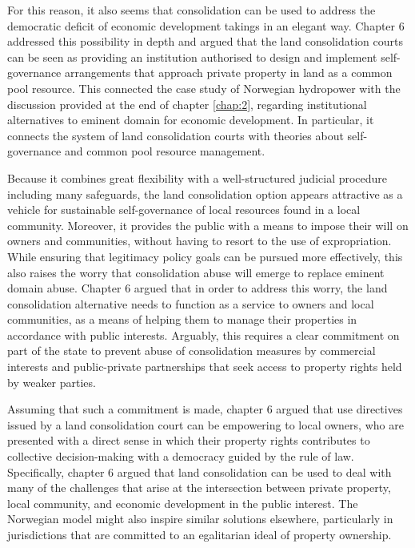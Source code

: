 For this reason, it also seems that consolidation can be used to address the democratic deficit of economic development takings in an elegant way. Chapter 6 addressed this possibility in depth and argued that the land consolidation courts can be seen as providing an institution authorised to design and implement self-governance arrangements that approach private property in land as a common pool resource. This connected the case study of Norwegian hydropower with the discussion provided at the end of chapter \ref{chap:2}, regarding institutional alternatives to eminent domain for economic development. In particular, it connects the system of land consolidation courts with theories about self-governance and common pool resource management.

Because it combines great flexibility with a well-structured judicial procedure including many safeguards, the land consolidation option appears attractive as a vehicle for sustainable self-governance of local resources found in a local community. Moreover, it provides the public with a means to impose their will on owners and communities, without having to resort to the use of expropriation. While ensuring that legitimacy policy goals can be pursued more effectively, this also raises the worry that consolidation abuse will emerge to replace eminent domain abuse. Chapter 6 argued that in order to address this worry, the land consolidation alternative needs to function as a service to owners and local communities, as a means of helping them to manage their properties in accordance with public interests. Arguably, this requires a clear commitment on part of the state to prevent abuse of consolidation measures by commercial interests and public-private partnerships that seek access to property rights held by weaker parties.

Assuming that such a commitment is made, chapter 6 argued that use directives issued by a land consolidation court can be empowering to local owners, who are presented with a direct sense in which their property rights contributes to collective decision-making with a democracy guided by the rule of law. Specifically, chapter 6 argued that land consolidation can be used to deal with many of the challenges that arise at the intersection between private property, local community, and economic development in the public interest. The Norwegian model might also inspire similar solutions elsewhere, particularly in jurisdictions that are committed to an egalitarian ideal of property ownership.

